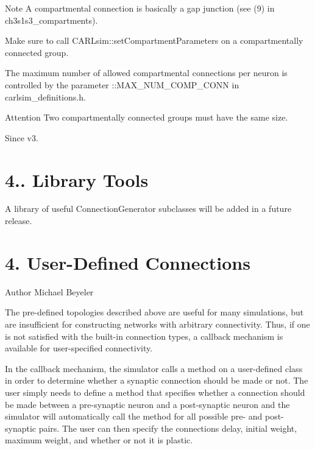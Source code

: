 \begin{DoxyNote}{Note}
A compartmental connection is basically a gap junction (see (9) in ch3s1s3\+\_\+compartments). 

Make sure to call C\+A\+R\+Lsim\+::set\+Compartment\+Parameters on a compartmentally connected group. 

The maximum number of allowed compartmental connections per neuron is controlled by the parameter \+::\+M\+A\+X\+\_\+\+N\+U\+M\+\_\+\+C\+O\+M\+P\+\_\+\+C\+O\+NN in carlsim\+\_\+definitions.\+h. 
\end{DoxyNote}
\begin{DoxyAttention}{Attention}
Two compartmentally connected groups must have the same size. 
\end{DoxyAttention}
\begin{DoxySince}{Since}
v3.
\end{DoxySince}
\hypertarget{ch4_connections_ch4s2_library_tools}{}\section{4.. Library Tools}\label{ch4_connections_ch4s2_library_tools}
A library of useful Connection\+Generator subclasses will be added in a future release.\hypertarget{ch4_connections_ch4s3_user_defined}{}\section{4. User-\/\+Defined Connections}\label{ch4_connections_ch4s3_user_defined}
\begin{DoxyAuthor}{Author}
Michael Beyeler
\end{DoxyAuthor}
The pre-\/defined topologies described above are useful for many simulations, but are insufficient for constructing networks with arbitrary connectivity. Thus, if one is not satisfied with the built-\/in connection types, a callback mechanism is available for user-\/specified connectivity.

In the callback mechanism, the simulator calls a method on a user-\/defined class in order to determine whether a synaptic connection should be made or not. The user simply needs to define a method that specifies whether a connection should be made between a pre-\/synaptic neuron and a post-\/synaptic neuron and the simulator will automatically call the method for all possible pre-\/ and post-\/synaptic pairs. The user can then specify the connection\textquotesingle{}s delay, initial weight, maximum weight, and whether or not it is plastic.

